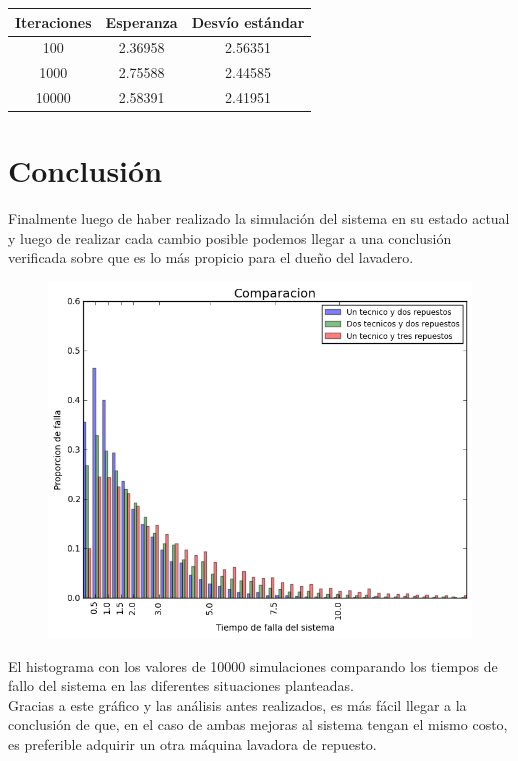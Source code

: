 \documentclass[10pt,a4paper]{article} %
\begin{document}
    \begin{center}
        \begin{tabular}{ c| c| c}
            Iteraciones & Esperanza & Desv\'io est\'andar \\ \hline
            100&    2.36958 & 2.56351  \\ \hline
            1000&   2.75588 & 2.44585  \\ \hline
            10000&  2.58391 & 2.41951  \\ \hline
        \end{tabular}
    \end{center}

    \newpage
    \section{Conclusi\'on}
    Finalmente luego de haber realizado la simulaci\'on del sistema en su estado actual y luego de realizar cada cambio posible podemos llegar a una conclusi\'on verificada sobre que es lo m\'as propicio para el due\~no del lavadero. \\
    
    \begin {figure}[!htb]
    \centering
    \includegraphics[width=12cm] {img/comparisson}
    \end {figure}
    
    El histograma con los valores de 10000 simulaciones comparando los tiempos de fallo del sistema en las diferentes situaciones planteadas.\\ 
    Gracias a este gr\'afico y las an\'alisis antes realizados, es m\'as f\'acil llegar a la conclusi\'on de que, en el caso de ambas mejoras al sistema tengan el mismo costo, es preferible adquirir un otra m\'aquina lavadora de repuesto.
\end{document}

